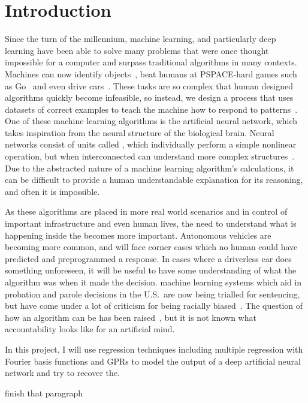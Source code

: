 
\chapter{Introduction}

Since the turn of the millennium, machine learning, and particularly deep learning have been able to solve many problems that were once thought impossible for a computer and surpass traditional algorithms in many contexts.
Machines can now identify objects~\autocite{li2018}, beat humans at PSPACE-hard games such as Go~\autocite{chao2018} and even drive cars~\autocite{gerla2014}.
These tasks are so complex that human designed algorithms quickly become infeasible, so instead, we design a process that uses datasets of correct examples to teach the machine how to respond to patterns~\autocite[1]{murphy2012}.
One of these machine learning algorithms is the artificial neural network, which takes inspiration from the neural structure of the biological brain.
Neural networks consist of units called , which individually perform a simple nonlinear operation, but when interconnected can understand more complex structures~\autocite[436]{lecun2015}.
Due to the abstracted nature of a machine learning algorithm's calculations, it can be difficult to provide a human understandable explanation for its reasoning, and often it is impossible.

As these algorithms are placed in more real world scenarios and in control of important infrastructure and even human lives, the need to understand what is happening inside the  becomes more important.
Autonomous vehicles are becoming more common, and will face corner cases which no human could have predicted and preprogrammed a response.
In cases where a driverless car does something unforeseen, it will be useful to have some understanding of what the algorithm was  when it made the decision.
machine learning systems which aid in probation and parole decisions in the U.S.\ are now being trialled for sentencing, but have come under a lot of criticism for being racially biased~\autocite{christin2015}.
The question of how an algorithm can be  has been raised~\autocite[9]{christin2015}, but it is not known what accountability looks like for an artificial mind.

In this project, I will use regression techniques including multiple regression with Fourier basis functions and \aclp{GPR} to model the output of a deep artificial neural network and try to recover the.

\begin{todo}
    finish that paragraph
\end{todo}
